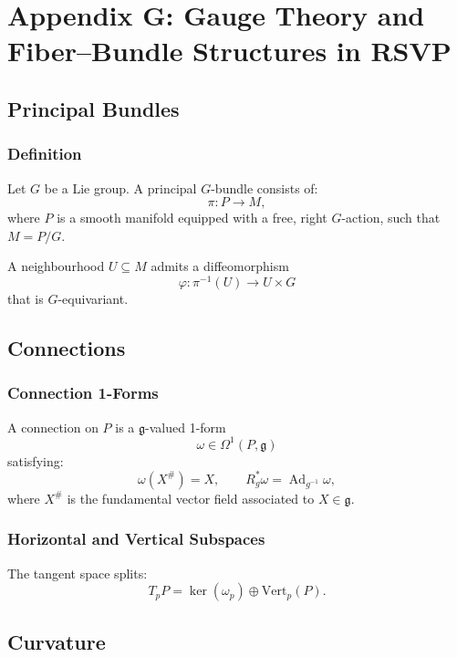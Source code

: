 \chapter*{Appendix G: Gauge Theory and Fiber--Bundle Structures in RSVP}

\section{Principal Bundles}

\subsection{Definition}

Let $G$ be a Lie group.  
A principal $G$-bundle consists of:
\[
\pi : P \to M,
\]
where $P$ is a smooth manifold equipped with a free, right $G$-action, such that $M = P/G$.

\begin{definition}
A neighbourhood $U\subseteq M$ admits a diffeomorphism
\[
\varphi : \pi^{-1}(U) \to U\times G
\]
that is $G$-equivariant.
\end{definition}

\section{Connections}

\subsection{Connection 1-Forms}

A connection on $P$ is a $\mathfrak{g}$-valued 1-form
\[
\omega \in \Omega^1(P,\mathfrak{g})
\]
satisfying:
\[
\omega(X^\#) = X, \qquad R_g^\ast \omega = \operatorname{Ad}_{g^{-1}} \omega,
\]
where $X^\#$ is the fundamental vector field associated to $X\in\mathfrak{g}$.

\subsection{Horizontal and Vertical Subspaces}

The tangent space splits:
\[
T_pP = \ker(\omega_p) \oplus \mathrm{Vert}_p(P).
\]

\section{Curvature}

